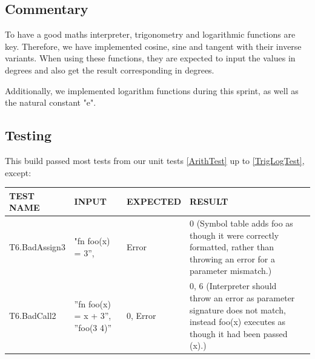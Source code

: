 \documentclass[a4paper, oneside, 11pt]{report}
\begin{document}
    \subsection{Commentary}
    To have a good maths interpreter, trigonometry and logarithmic functions are key. Therefore, we have implemented cosine, sine and tangent with their inverse variants. When using these functions, they are expected to input the values in degrees and also get the result corresponding in degrees.

    Additionally, we implemented logarithm functions during this sprint, as well as the natural constant "e".

    \subsection{Testing}
    This build passed most tests from our unit tests \ref{ArithTest} up to \ref{TrigLogTest}, except:
    \begin{center}
        \begin{tabular}{|p{1.5in}|p{1.5in}|p{1in}|p{1.6in}|p{2.4in}|}
            \hline
            TEST NAME & INPUT & EXPECTED & RESULT \\
            \hline
            T6.BadAssign3 & "fn foo(x) = 3”, & Error & 0 (Symbol table adds foo as though it were correctly formatted, rather than throwing an error for a parameter mismatch.) \\
            \hline
            T6.BadCall2 & ”fn foo(x) = x + 3”, ”foo(3 4)” & 0, Error & 0, 6 (Interpreter should throw an error as parameter signature does not match, instead foo(x) executes as though it had been passed (x).) \\
            \hline
        \end{tabular}
    \end{center}

    \clearpage
\end{document}
